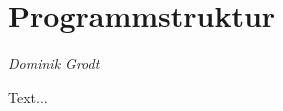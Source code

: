 \chapter{Programmstruktur}
\thispagestyle{empty}

\begin{center}
\emph{{\small Dominik Grodt}}
\end{center}

\bigskip

Text...
